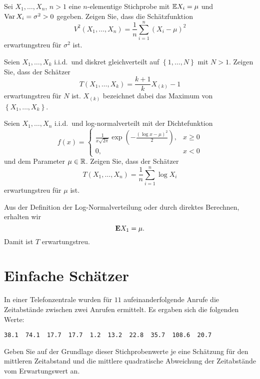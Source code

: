 Sei $X_{1},\dots ,X_n$, $n>1$ eine $n$-elementige Stichprobe mit $\mathbb{E} X_i =
\mu$ und $\operatorname{Var} X_i = \sigma^2>0$ gegeben. Zeigen Sie, dass die Schätzfunktion 
\begin{equation*}
    V^{2}\left( X_1,\dots ,  X_n \right) = \frac{1}{n} \sum_{i=1}^{n} \left( X_i - \mu \right)^2
\end{equation*} 
erwartungstreu für $\sigma^2$ ist. 


 Seien
$X_1,\dots ,X_k$ i.i.d.\ und diskret gleichverteilt auf $\left\{ 1,\dots ,N
\right\}$ mit $N>1$. Zeigen Sie, dass der Schätzer
\begin{equation*}
    T\left( X_1,\dots ,X_k \right) = \frac{k+1}{k} X_{(k)}-1
\end{equation*}
erwartungstreu für $N$ ist. $X_{(k)}$ bezeichnet dabei das Maximum von $\left\{
X_1,\dots ,X_k \right\}$. 

 Seien $X_1,\dots
,X_n$ i.i.d.\ und log-normalverteilt mit der Dichtefunktion
\begin{equation*}
    f(x) = \begin{cases}
        \frac{1}{ x\sqrt{2\pi} } \exp \left( - \frac{ (\log x - \mu)^2 }{ 2 } \right), & x\geq 0 \\
        0, & x<0
    \end{cases}
\end{equation*}
und dem Parameter $\mu\in\mathbb R$. Zeigen Sie, dass der Schätzer 
\begin{equation*}
    T\left( X_1,\dots ,X_n \right) = \frac{1}{n} \sum_{i=1}^{n} \log X_i
\end{equation*}
erwartungstreu für $\mu$ ist. 

\solution Aus der Definition der Log-Normalverteilung oder durch
direktes Berechnen, erhalten wir
\begin{equation*}
    \mathbf E X_1 = \mu.
\end{equation*}
Damit ist $T$ erwartungstreu.


\section{Einfache Schätzer}

 In einer Telefonzentrale wurden für $11$
aufeinanderfolgende Anrufe die Zeitabstände zwischen zwei Anrufen ermittelt. Es
ergaben sich die folgenden Werte:
\begin{lstlisting}
38.1  74.1  17.7  17.7  1.2  13.2  22.8  35.7  108.6  20.7
\end{lstlisting}
Geben Sie auf der Grundlage dieser Stichprobenwerte je eine Schätzung für den
mittleren Zeitabstand und die mittlere quadratische Abweichung der Zeitabstände
vom Erwartungswert an. 

